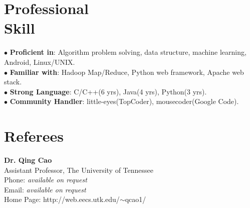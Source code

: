 \documentclass[margin, centered]{resume}
\begin{document}
\begin{resume}
    \section{\mysidestyle Professional \\Skill} 
	
	$\bullet$ \textbf{Proficient in}: Algorithm problem solving, data structure, machine learning, Android, Linux/UNIX.\vspace{0mm}\\
	$\bullet$ \textbf{Familiar with}: Hadoop Map/Reduce, Python web framework, Apache web stack.\vspace{0mm}\\
    $\bullet$ \textbf{Strong Language}: C/C++(6 yrs), Java(4 yrs), Python(3 yrs).\vspace{0mm}\\
	$\bullet$ \textbf{Community Handler}: little-eyes(TopCoder), mousecoder(Google Code).\vspace{0mm}\\


\section{\mysidestyle Referees} 

\textbf{Dr. Qing Cao}\\
Assistant Professor, The University of Tennessee\\
Phone: \textsl{available on request}\\
Email: \textsl{available on request}\\
Home Page: http://web.eecs.utk.edu/$\sim$qcao1/

\end{resume}
\end{document}
